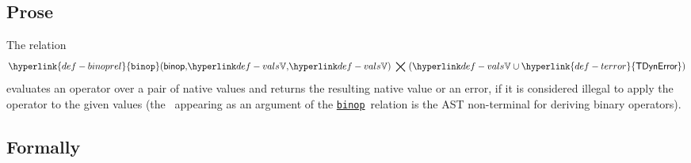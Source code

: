 \documentclass{book}
\newcommand\TError[0]{\hyperlink{def-terror}{\textsf{TDynError}}}
\newcommand\binoprel[0]{\hyperlink{def-binoprel}{\texttt{binop}}}
\begin{document}
\subsection{Prose}
\hypertarget{def-binoprel}{}
The relation
\[
  \binoprel(\binop \aslsep \vals \aslsep \vals) \;\aslrel\; (\vals \cup \TError)
\]
evaluates an operator over a pair of native values and returns the resulting
native value or an error, if it is considered illegal to apply the operator
to the given values (the \binop\ appearing as an argument of the \binoprel\ relation
is the AST non-terminal for deriving binary operators).

\begin{emptyformal}
\subsection{Formally}


\end{emptyformal}
\end{document}
